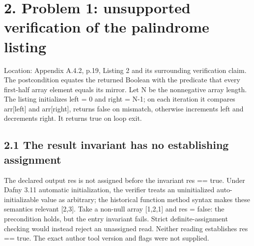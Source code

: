 \documentclass[10pt]{article}
\begin{document}
\section*{2. Problem 1: unsupported verification of the palindrome listing}
Location: Appendix A.4.2, p.19, Listing 2 and its surrounding verification claim. The postcondition equates the returned Boolean with the predicate that every first-half array element equals its mirror. Let N be the nonnegative array length. The listing initializes left = 0 and right = N-1; on each iteration it compares arr[left] and arr[right], returns false on mismatch, otherwise increments left and decrements right. It returns true on loop exit.\par
\subsection*{2.1 The result invariant has no establishing assignment}
The declared output res is not assigned before the invariant res == true. Under Dafny 3.11 automatic initialization, the verifier treats an uninitialized auto-initializable value as arbitrary; the historical function method syntax makes these semantics relevant [2,3]. Take a non-null array [1,2,1] and res = false: the precondition holds, but the entry invariant fails. Strict definite-assignment checking would instead reject an unassigned read. Neither reading establishes res == true. The exact author tool version and flags were not supplied.\par
\end{document}
